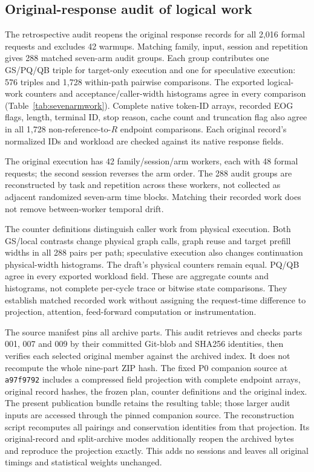 \subsection{Original-response audit of logical work}
\label{supp:sevenarmwork}
The retrospective audit reopens the original response records for all 2,016 formal requests and excludes 42 warmups. Matching family, input, session and repetition gives 288 matched seven-arm audit groups. Each group contributes one GS/PQ/QB triple for target-only execution and one for speculative execution: 576 triples and 1,728 within-path pairwise comparisons. The exported logical-work counters and acceptance/caller-width histograms agree in every comparison (Table~\ref{tab:sevenarmwork}). Complete native token-ID arrays, recorded EOG flags, length, terminal ID, stop reason, cache count and truncation flag also agree in all 1,728 non-reference-to-$R$ endpoint comparisons. Each original record's normalized IDs and workload are checked against its native response fields.



The original execution has 42 family/session/arm workers, each with 48 formal requests; the second session reverses the arm order. The 288 audit groups are reconstructed by task and repetition across these workers, not collected as adjacent randomized seven-arm time blocks. Matching their recorded work does not remove between-worker temporal drift.

The counter definitions distinguish caller work from physical execution. Both GS/local contrasts change physical graph calls, graph reuse and target prefill widths in all 288 pairs per path; speculative execution also changes continuation physical-width histograms. The draft's physical counters remain equal. PQ/QB agree in every exported workload field. These are aggregate counts and histograms, not complete per-cycle trace or bitwise state comparisons. They establish matched recorded work without assigning the request-time difference to projection, attention, feed-forward computation or instrumentation.

The source manifest pins all archive parts. This audit retrieves and checks parts 001, 007 and 009 by their committed Git-blob and SHA256 identities, then verifies each selected original member against the archived index. It does not recompute the whole nine-part ZIP hash. The fixed P0 companion source at \texttt{a97f9792} includes a compressed field projection with complete endpoint arrays, original record hashes, the frozen plan, counter definitions and the original index. The present publication bundle retains the resulting table; those larger audit inputs are accessed through the pinned companion source. The reconstruction script recomputes all pairings and conservation identities from that projection. Its original-record and split-archive modes additionally reopen the archived bytes and reproduce the projection exactly. This adds no sessions and leaves all original timings and statistical weights unchanged.

